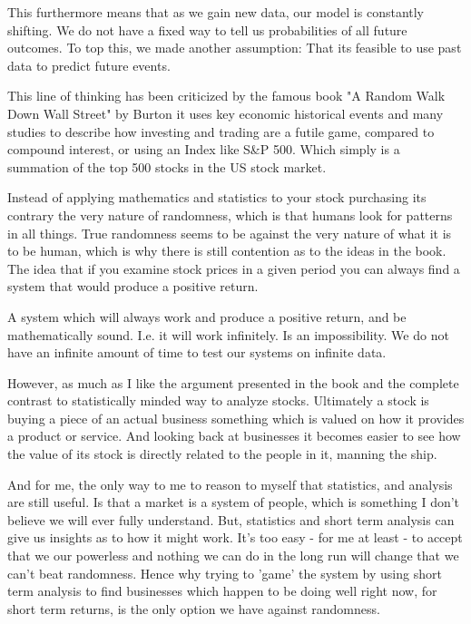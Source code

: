 \documentclass[12pt]{article}
\begin{document}
    This furthermore means that as we gain new data, our model is constantly shifting.
    We do not have a fixed way to tell us probabilities of all future outcomes.
    To top this, we made another assumption: That its feasible to use past data to predict
    future events.

    This line of thinking has been criticized by the famous book "A Random Walk Down
    Wall Street" by Burton \cite{Burton} it uses
    key economic historical events and many studies to describe how investing and trading are
    a futile game, compared to compound interest, or using an Index like S\&P 500. Which
    simply is a summation of the top 500 stocks in the US stock market.

    Instead of applying mathematics and statistics to your stock purchasing its contrary the 
    very nature of randomness, which is that humans look for patterns in all things. True 
    randomness seems to be against the very nature of what it is to be human, which is why
    there is still contention as to the ideas in the book. The idea that if you examine stock
    prices in a given period you can always find a system that would produce a positive return.

    A system which will always work and produce a positive return, and be mathematically sound. 
    I.e. it will work infinitely. Is an impossibility. We do not have an infinite amount of
    time to test our systems on infinite data.

    However, as much as I like the argument presented in the book and the complete contrast to 
    statistically minded way to analyze stocks. Ultimately a stock is buying a piece of an 
    actual business something which is valued on how it provides a product or service. And 
    looking back at businesses it becomes easier to see how the value of its stock is directly 
    related to the people in it, manning the ship.

    And for me, the only way to me to reason to myself that statistics, and analysis are still 
    useful. Is that a market is a system of people, which is something I don't believe we will 
    ever fully understand. But, statistics and short term analysis can give us insights as to 
    how it might work. It's too easy - for me at least - to accept that we our powerless and 
    nothing we can do in the long run will change that we can't beat randomness. Hence why
    trying to 'game' the system by using short term analysis to find businesses which happen
    to be doing well right now, for short term returns, is the only option we have against
    randomness.
\end{document}
